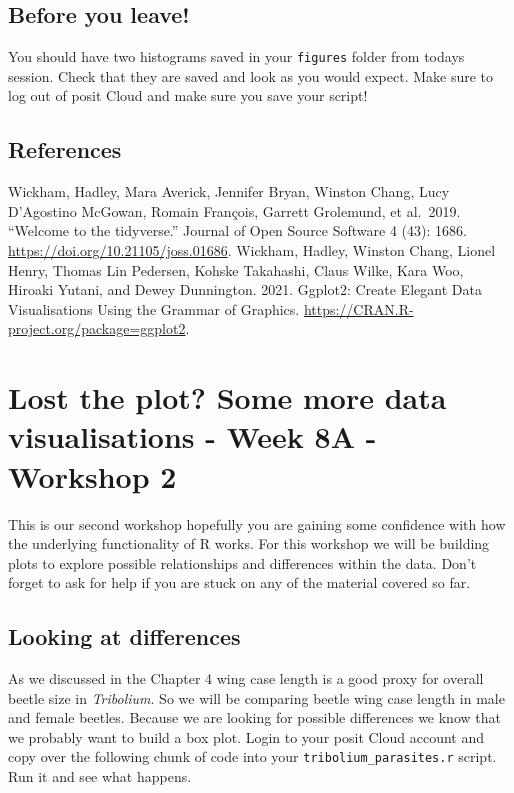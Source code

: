 \documentclass[
]{book}
\begin{document}
\hypertarget{before-you-leave-2}{%
\section{Before you leave!}\label{before-you-leave-2}}

You should have two histograms saved in your \texttt{figures} folder from todays session. Check that they are saved and look as you would expect. Make sure to log out of posit Cloud and make sure you save your script!

\hypertarget{references-3}{%
\section{References}\label{references-3}}

Wickham, Hadley, Mara Averick, Jennifer Bryan, Winston Chang, Lucy D'Agostino McGowan, Romain François, Garrett Grolemund, et al.~2019. ``Welcome to the tidyverse.'' Journal of Open Source Software 4 (43): 1686. \url{https://doi.org/10.21105/joss.01686}.
Wickham, Hadley, Winston Chang, Lionel Henry, Thomas Lin Pedersen, Kohske Takahashi, Claus Wilke, Kara Woo, Hiroaki Yutani, and Dewey Dunnington. 2021. Ggplot2: Create Elegant Data Visualisations Using the Grammar of Graphics. \url{https://CRAN.R-project.org/package=ggplot2}.

\hypertarget{lost-the-plot-some-more-data-visualisations---week-8a---workshop-2}{%
\chapter{Lost the plot? Some more data visualisations - Week 8A - Workshop 2}\label{lost-the-plot-some-more-data-visualisations---week-8a---workshop-2}}

This is our second workshop hopefully you are gaining some confidence with how the underlying functionality of R works. For this workshop we will be building plots to explore possible relationships and differences within the data. Don't forget to ask for help if you are stuck on any of the material covered so far.

\hypertarget{boxplot}{%
\section{Looking at differences}\label{boxplot}}

As we discussed in the Chapter 4 wing case length is a good proxy for overall beetle size in \emph{Tribolium}. So we will be comparing beetle wing case length in male and female beetles. Because we are looking for possible differences we know that we probably want to build a box plot. Login to your posit Cloud account and copy over the following chunk of code into your \texttt{tribolium\_parasites.r} script. Run it and see what happens.
\end{document}

